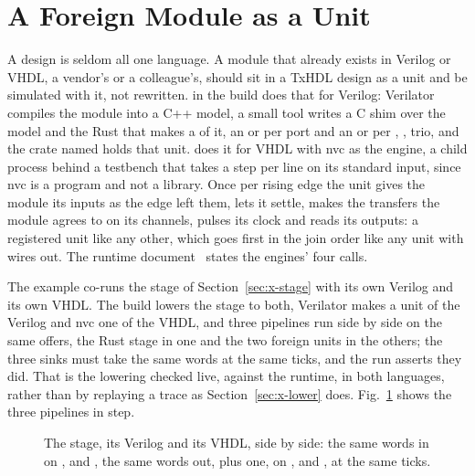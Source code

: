 \section{A Foreign Module as a Unit}
\label{sec:x-foreign}

A design is seldom all one language. A module that already exists in
Verilog or VHDL, a vendor's or a colleague's, should sit in a TxHDL
design as a unit and be simulated with it, not rewritten.
 in the build does that for Verilog: Verilator
compiles the module into a C++ model, a small tool writes a C shim
over the model and the Rust that makes a  of it, an
 or  per port and an  or  per
, ,  trio, and the
crate named holds that unit.  does it for VHDL
with nvc as the engine, a child process behind a testbench that
takes a step per line on its standard input, since nvc is a program
and not a library. Once per rising edge the unit gives the module
its inputs as the edge left them, lets it settle, makes the
transfers the module agrees to on its channels, pulses its clock and
reads its outputs: a registered unit like any other, which goes
first in the join order like any unit with wires out. The runtime
document~\cite{runtime} states the engines' four calls.

The example co-runs the stage of Section~\ref{sec:x-stage} with its
own Verilog and its own VHDL. The build lowers the stage to both,
Verilator makes a unit of the Verilog and nvc one of the VHDL, and
three pipelines run side by side on the same offers, the Rust stage
in one and the two foreign units in the others; the three sinks
must take the same words at the same ticks, and the run asserts
they did. That is the lowering checked live, against the runtime, in
both languages, rather than by replaying a trace as
Section~\ref{sec:x-lower} does. Fig.~\ref{fig:x-foreign} shows the
three pipelines in step.

\begin{figure}[htbp]
\centering

\caption{The stage, its Verilog and its VHDL, side by side: the
same words in on ,  and , the same
words out, plus one, on ,  and ,
at the same ticks.}
\label{fig:x-foreign}
\end{figure}





